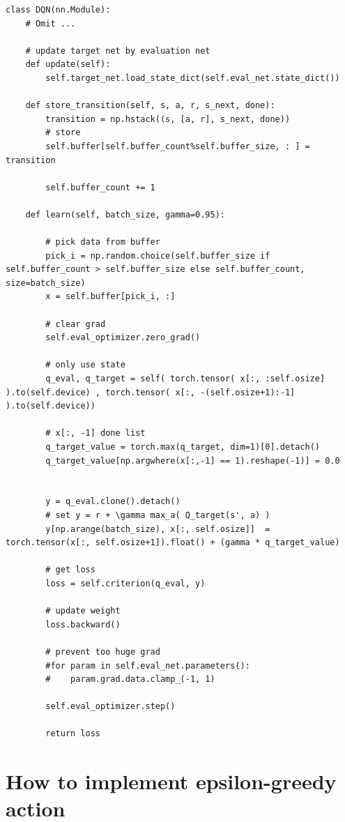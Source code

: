 \documentclass[12pt]{article}
\begin{document}
\begin{verbatim}
class DQN(nn.Module):
    # Omit ...

    # update target net by evaluation net
    def update(self):
        self.target_net.load_state_dict(self.eval_net.state_dict())
        
    def store_transition(self, s, a, r, s_next, done):
        transition = np.hstack((s, [a, r], s_next, done))
        # store
        self.buffer[self.buffer_count%self.buffer_size, : ] = transition
        
        self.buffer_count += 1
    
    def learn(self, batch_size, gamma=0.95):
        
        # pick data from buffer
        pick_i = np.random.choice(self.buffer_size if self.buffer_count > self.buffer_size else self.buffer_count, size=batch_size)
        x = self.buffer[pick_i, :]
        
        # clear grad
        self.eval_optimizer.zero_grad()
        
        # only use state
        q_eval, q_target = self( torch.tensor( x[:, :self.osize] ).to(self.device) , torch.tensor( x[:, -(self.osize+1):-1] ).to(self.device)) 
        
        # x[:, -1] done list
        q_target_value = torch.max(q_target, dim=1)[0].detach()
        q_target_value[np.argwhere(x[:,-1] == 1).reshape(-1)] = 0.0

        
        y = q_eval.clone().detach()
        # set y = r + \gamma max_a( Q_target(s', a) )
        y[np.arange(batch_size), x[:, self.osize]]  = torch.tensor(x[:, self.osize+1]).float() + (gamma * q_target_value)
        
        # get loss
        loss = self.criterion(q_eval, y)
        
        # update weight
        loss.backward()
        
        # prevent too huge grad
        #for param in self.eval_net.parameters():
        #    param.grad.data.clamp_(-1, 1)
        
        self.eval_optimizer.step()
        
        return loss
\end{verbatim}

\section{How to implement epsilon-greedy action}
\end{document}
